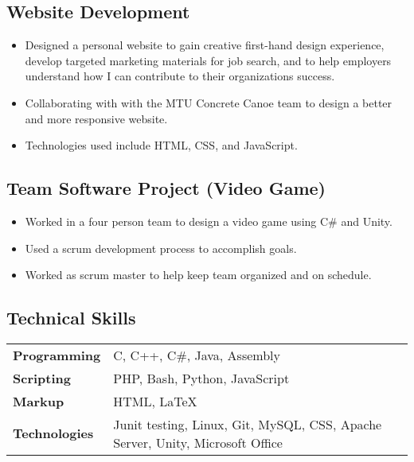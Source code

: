 \documentclass[12pt]{article}
\begin{document}
\subsection{Website Development}\hfill
\begin{itemize}[label=]
    \item Designed a personal website to gain creative first-hand design experience, develop targeted marketing materials for job search, and to help employers understand how I can contribute to their organizations success.
    \item Collaborating with with the MTU Concrete Canoe team to design a better and more responsive website.
    \item Technologies used include HTML, CSS, and JavaScript.
\end{itemize}
\subsection{Team Software Project (Video Game)} \hfill
\begin{itemize}[label=]
    \item Worked in a four person team to design a video game using C\# and Unity.

    \item Used a scrum development process to accomplish goals.

    \item Worked as scrum master to help keep team organized and on schedule.
\end{itemize}

\vspace{4pt}
\subsection{Technical Skills} \hfill

\vspace{5pt}
\begin{tabular}{l l}
    {\bfseries Programming}   & C, C++, C\#, Java, Assembly \\
    {\bfseries Scripting}     & PHP, Bash, Python, JavaScript  \\
    {\bfseries Markup}        &  HTML, {\LaTeX}\\
    {\bfseries Technologies}  & Junit testing, Linux, Git, MySQL, CSS, Apache Server, Unity, Microsoft Office \\

\end{tabular}\\
\end{document}
